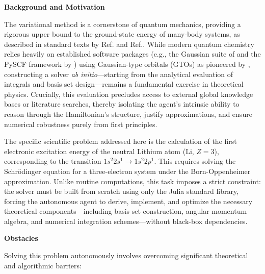 \documentclass[11pt, a4paper, logo, copyright, nonumbering]{SAI}
\begin{document}
\noindent \textbf{Background and Motivation}

The variational method is a cornerstone of quantum mechanics, providing a rigorous upper bound to the ground-state energy of many-body systems, as described in standard texts by Ref. \cite{Griffiths:2018} and Ref.\cite{Levine:2013qj}. 
While modern quantum chemistry relies heavily on established software packages (e.g., the Gaussian suite of \cite{Gaussian16} and the PySCF framework by \cite{Sun:2018}) using Gaussian-type orbitals (GTOs) as pioneered by \cite{Boys:1950}, 
constructing a solver \textit{ab initio}—starting from the analytical evaluation of integrals and basis set design—remains a fundamental exercise in theoretical physics. Crucially, this evaluation precludes access to external global knowledge bases or literature searches, thereby isolating the agent's intrinsic ability to reason through the Hamiltonian's structure, justify approximations, and ensure numerical robustness purely from first principles.

The specific scientific problem addressed here is the calculation of the first electronic excitation energy of the neutral Lithium atom (Li, $Z=3$), corresponding to the transition $1s^2 2s^1 \to 1s^2 2p^1$.
This requires solving the Schrödinger equation for a three-electron system under the Born-Oppenheimer approximation.
Unlike routine computations, this task imposes a strict constraint: the solver must be built from scratch using only the Julia standard library, 
forcing the autonomous agent to derive, implement, and optimize the necessary theoretical components—including basis set construction, angular momentum algebra, and numerical integration schemes—without black-box dependencies.

\noindent \textbf{Obstacles}

Solving this problem autonomously involves overcoming significant theoretical and algorithmic barriers:
\end{document}
